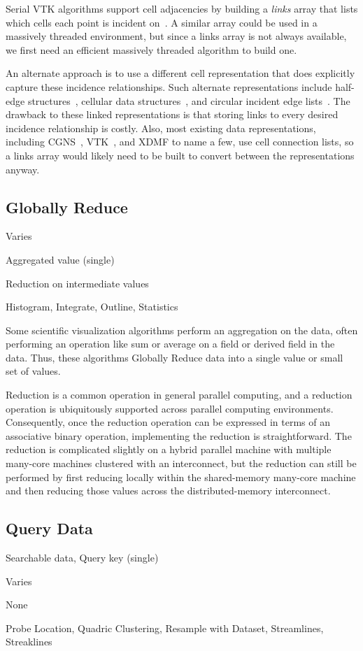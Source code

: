 \documentclass{sig-alternate}
\newcommand*{\lcite}[1]{~\cite{#1}}
\newcommand*{\keyterm}[1]{\emph{#1}}
\newcommand{\algclass}[1]{\textsf{#1}}
\newcommand{\algorithmclasssection}[1]{\subsection*{#1}}
\newcommand{\algorithmclass}[5]{
  \algorithmclasssection{#1} %
  \begin{description}[leftmargin=9em,style=nextline,noitemsep]
    \raggedright
  \item[Input] #2
  \item[Output] #3
  \item[Interdependence] #4
  \item[Algorithms] #5
  \end{description}
}
\begin{document}
Serial VTK algorithms support cell adjacencies by building a
\keyterm{links} array that lists which cells each point is incident
on\lcite{VTKUsersGuide}. A similar array could be used in a massively
threaded environment, but since a links array is not always available, we
first need an efficient massively threaded algorithm to build one.

An alternate approach is to use a different cell representation that does
explicitly capture these incidence relationships. Such alternate
representations include half-edge structures\lcite{Kettner1998}, cellular
data structures\lcite{Alumbaugh2005}, and circular incident edge
lists\lcite{Levy2001}. The drawback to these linked representations is that
storing links to every desired incidence relationship is costly. Also, most
existing data representations, including CGNS\lcite{CGNS}, VTK\lcite{VTK},
and XDMF to name a few, use cell connection lists, so a links array would
likely need to be built to convert between the representations anyway.


\algorithmclass{Globally Reduce}
               {Varies} %
               {Aggregated value (single)} %
               {Reduction on intermediate values} %
               {Histogram, Integrate, Outline, Statistics}

\noindent
Some scientific visualization algorithms perform an aggregation on the
data, often performing an operation like sum or average on a field or
derived field in the data. Thus, these algorithms \algclass{Globally
  Reduce} data into a single value or small set of values.

Reduction is a common operation in general parallel computing, and a
reduction operation is ubiquitously supported across parallel computing
environments. Consequently, once the reduction operation can be expressed
in terms of an associative binary operation, implementing the reduction is
straightforward. The reduction is complicated slightly on a hybrid parallel
machine with multiple many-core machines clustered with an interconnect,
but the reduction can still be performed by first reducing locally within
the shared-memory many-core machine and then reducing those values across
the distributed-memory interconnect.


\algorithmclass{Query Data}
               {Searchable data, Query key (single)} %
               {Varies} %
               {None} %
               {Probe Location, Quadric Clustering, Resample with Dataset,
                 Streamlines, Streaklines}
\end{document}
